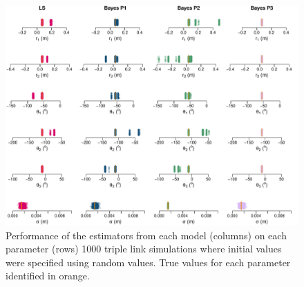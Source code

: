 \documentclass{article}
\begin{document}
\begin{figure}
\centering
\includegraphics[width=\textwidth]{./Figures/TripleLink_StripChart_random.pdf}
\caption{Performance of the estimators from each model (columns) on each parameter (rows) 1000 triple link simulations where initial values were specified using random values.  True values for each parameter identified in orange.}
\label{fig:StripChart_random}
\end{figure}
\end{document}
